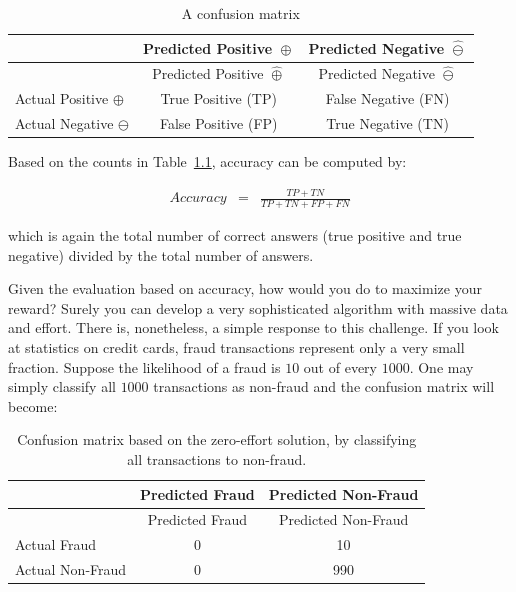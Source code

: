 \documentclass[
  letterpaper,
]{scrbook}
\newcounter{none} %
\begin{document}
\protect{}\label{tab-eval-cmatrix}
\begin{longtable}[]{@{}lcc@{}}
\caption{A confusion matrix}\tabularnewline
\toprule\noalign{}
& Predicted Positive \(\hat{\oplus}\) & Predicted Negative
\(\hat{\ominus}\) \\
\midrule\noalign{}
\endfirsthead
\toprule\noalign{}
& Predicted Positive \(\hat{\oplus}\) & Predicted Negative
\(\hat{\ominus}\) \\
\midrule\noalign{}
\endhead
\bottomrule\noalign{}
\endlastfoot
Actual Positive \(\oplus\) & True Positive (TP) & False Negative (FN) \\
Actual Negative \(\ominus\) & False Positive (FP) & True Negative
(TN) \\
\end{longtable}

Based on the counts in Table~\hyperref[tab-eval-cmatrix]{1.1}, accuracy
can be computed by:

\[\begin{aligned}
  Accuracy & = & \frac{TP + TN}{TP + TN + FP + FN}
\end{aligned}\]

which is again the total number of correct answers (true positive and
true negative) divided by the total number of answers.

Given the evaluation based on accuracy, how would you do to maximize
your reward? Surely you can develop a very sophisticated algorithm with
massive data and effort. There is, nonetheless, a simple response to
this challenge. If you look at statistics on credit cards, fraud
transactions represent only a very small fraction. Suppose the
likelihood of a fraud is \(10\) out of every \(1000\). One may simply
classify all \(1000\) transactions as non-fraud and the confusion matrix
will become:

\protect{}\label{tab-eval-cmatrix0}
\begin{longtable}[]{@{}lcc@{}}
\caption{Confusion matrix based on the zero-effort solution, by
classifying all transactions to non-fraud.}\tabularnewline
\toprule\noalign{}
& Predicted Fraud & Predicted Non-Fraud \\
\midrule\noalign{}
\endfirsthead
\toprule\noalign{}
& Predicted Fraud & Predicted Non-Fraud \\
\midrule\noalign{}
\endhead
\bottomrule\noalign{}
\endlastfoot
Actual Fraud & 0 & 10 \\
Actual Non-Fraud & 0 & 990 \\
\end{longtable}
\end{document}

